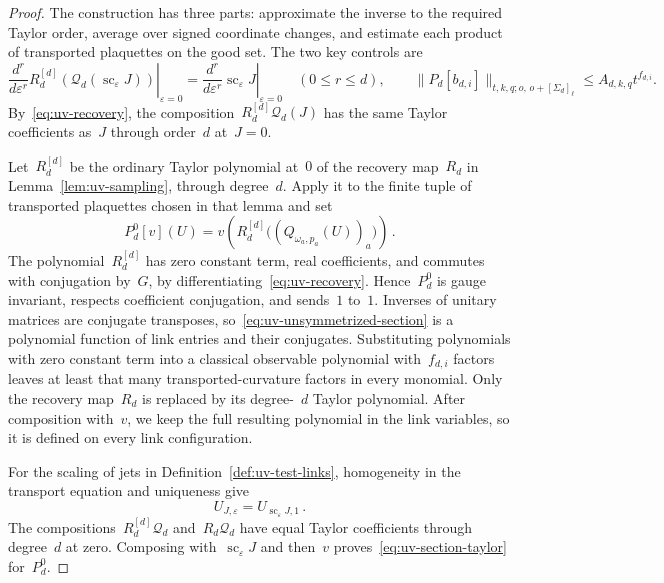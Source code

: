\begin{proof}
The construction has three parts: approximate the inverse to the required Taylor order, average over signed coordinate changes, and estimate each product of transported plaquettes on the good set.
The two key controls are
\begin{equation*}
 \left.\frac{d^r}{d\varepsilon^r}R_d^{[d]}\!\left(\mathcal Q_d(\operatorname{sc}_\varepsilon J)\right)\right|_{\varepsilon=0}
 =\left.\frac{d^r}{d\varepsilon^r}\operatorname{sc}_\varepsilon J\right|_{\varepsilon=0}\quad(0\le r\le d),
 \qquad \|P_d[b_{d,i}]\|_{t,k,q;o,\,o+[\Sigma_d]_\ell}
 \le A_{d,k,q}t^{f_{d,i}}.
\end{equation*}
By~\eqref{eq:uv-recovery}, the composition~$R_d^{[d]}\mathcal Q_d(J)$ has the same Taylor coefficients as~$J$ through order~$d$ at~$J=0$.


Let~$R_d^{[d]}$ be the ordinary Taylor polynomial at~$0$ of the recovery map~$R_d$ in Lemma~\ref{lem:uv-sampling}, through degree~$d$.
Apply it to the finite tuple of transported plaquettes chosen in that lemma and set
\begin{equation}\label{eq:uv-unsymmetrized-section}
 P_d^0[v](U)=v\!\left(R_d^{[d]}\bigl((Q_{\omega_a,p_a}(U))_a\bigr)\right)\,.
\end{equation}
The polynomial~$R_d^{[d]}$ has zero constant term, real coefficients, and commutes with conjugation by~$G$, by differentiating~\eqref{eq:uv-recovery}.
Hence~$P_d^0$ is gauge invariant, respects coefficient conjugation, and sends~$1$ to~$1$.
Inverses of unitary matrices are conjugate transposes, so~\eqref{eq:uv-unsymmetrized-section} is a polynomial function of link entries and their conjugates.
Substituting polynomials with zero constant term into a classical observable polynomial with~$f_{d,i}$ factors leaves at least that many transported-curvature factors in every monomial.
Only the recovery map~$R_d$ is replaced by its degree-~$d$ Taylor polynomial. After composition with~$v$, we keep the full resulting polynomial in the link variables, so it is defined on every link configuration.

For the scaling of jets in Definition~\ref{def:uv-test-links}, homogeneity in the transport equation and uniqueness give
\begin{equation}\label{eq:uv-scaled-jet}
 U_{J,\varepsilon}=U_{\operatorname{sc}_\varepsilon J,1}\,.
\end{equation}
The compositions~$R_d^{[d]}\mathcal Q_d$ and~$R_d\mathcal Q_d$ have equal Taylor coefficients through degree~$d$ at zero.
Composing with~$\operatorname{sc}_\varepsilon J$ and then~$v$ proves~\eqref{eq:uv-section-taylor} for~$P_d^0$.


\end{proof}
